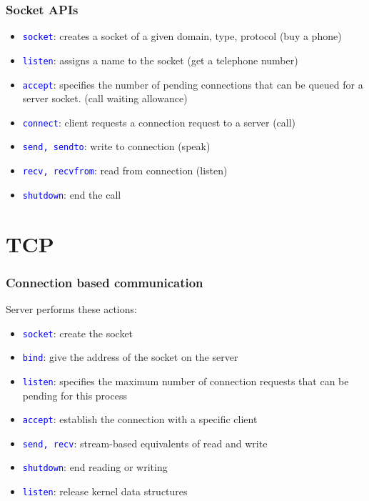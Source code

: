 \documentclass[12pt]{beamer}
\begin{document}
\begin{frame}
	\frametitle{Socket APIs}
	\begin{itemize}
		\item \textcolor{blue}{\texttt{socket}}: creates a socket of a given domain, type, protocol
(buy a phone)
		\item \textcolor{blue}{\texttt{listen}}: assigns a name to the socket (get a telephone number)
		\item \textcolor{blue}{\texttt{accept}}: specifies the number of pending connections that can be queued for a server socket. (call waiting allowance)
		\item \textcolor{blue}{\texttt{connect}}: client requests a connection request to a server
(call)	
		\item \textcolor{blue}{\texttt{send, sendto}}: write to connection (speak)
		\item \textcolor{blue}{\texttt{recv, recvfrom}}: read from connection (listen)		
		\item \textcolor{blue}{\texttt{shutdown}}: end the call	
	\end{itemize}
\end{frame}

\section{TCP}
\begin{frame}
	\frametitle{Connection based communication}
	{\small Server performs these actions:}
	\begin{itemize}
		\item \textcolor{blue}{\texttt{socket}}: create the socket
		\item \textcolor{blue}{\texttt{bind}}: give the address of the socket on the server
		\item \textcolor{blue}{\texttt{listen}}: specifies the maximum number of connection requests that can be pending for this process
		\item \textcolor{blue}{\texttt{accept}}: establish the connection with a specific client
		\item \textcolor{blue}{\texttt{send, recv}}: stream-based equivalents of read and write
		\item \textcolor{blue}{\texttt{shutdown}}: end reading or writing
		\item \textcolor{blue}{\texttt{listen}}: release kernel data structures
	\end{itemize}
\end{frame}
\end{document}
